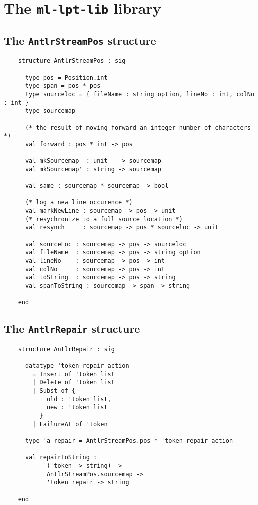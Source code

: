 \chapter{The {\tt ml-lpt-lib} library}\label{ch:ml-lpt-lib}



\section{The {\tt AntlrStreamPos} structure}

\begin{verbatim}
    structure AntlrStreamPos : sig

      type pos = Position.int
      type span = pos * pos
      type sourceloc = { fileName : string option, lineNo : int, colNo : int }
      type sourcemap

      (* the result of moving forward an integer number of characters *)
      val forward : pos * int -> pos

      val mkSourcemap  : unit   -> sourcemap
      val mkSourcemap' : string -> sourcemap

      val same : sourcemap * sourcemap -> bool

      (* log a new line occurence *)
      val markNewLine : sourcemap -> pos -> unit
      (* resychronize to a full source location *)
      val resynch     : sourcemap -> pos * sourceloc -> unit

      val sourceLoc : sourcemap -> pos -> sourceloc
      val fileName  : sourcemap -> pos -> string option
      val lineNo    : sourcemap -> pos -> int
      val colNo     : sourcemap -> pos -> int
      val toString  : sourcemap -> pos -> string
      val spanToString : sourcemap -> span -> string

    end
\end{verbatim}


\section{The {\tt AntlrRepair} structure}

\begin{verbatim}
    structure AntlrRepair : sig

      datatype 'token repair_action
        = Insert of 'token list
        | Delete of 'token list
        | Subst of {
            old : 'token list,
            new : 'token list
          }
        | FailureAt of 'token
      
      type 'a repair = AntlrStreamPos.pos * 'token repair_action
      
      val repairToString : 
            ('token -> string) -> 
            AntlrStreamPos.sourcemap -> 
            'token repair -> string
        
    end
\end{verbatim}